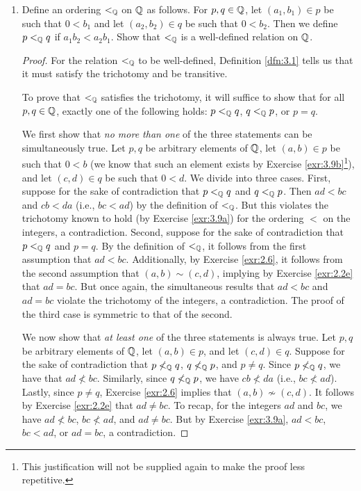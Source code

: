 \documentclass[../main.tex]{subfiles}
\begin{document}
\begin{exercise}
\begin{enumerate}[label={\alph*)},ref={\thetheorem\alph*}]
\begin{proof}
        \end{proof}
        \item \label{exr:3.9c}Define an ordering $<_{\mathbb{Q}}$ on $\mathbb{Q}$ as follows. For $p,q\in\mathbb{Q}$, let $(a_1,b_1)\in p$ be such that $0<b_1$ and let $(a_2,b_2)\in q$ be such that $0<b_2$. Then we define $p<_{\mathbb{Q}} q$ if $a_1b_2<a_2b_1$. Show that $<_{\mathbb{Q}}$ is a well-defined relation on $\mathbb{Q}$.
        \begin{proof}
            For the relation $<_{\mathbb{Q}}$ to be well-defined, Definition \ref{dfn:3.1} tells us that it must satisfy the trichotomy and be transitive.\par\smallskip
            To prove that $<_{\mathbb{Q}}$ satisfies the trichotomy, it will suffice to show that for all $p,q\in\mathbb{Q}$, exactly one of the following holds: $p<_{\mathbb{Q}} q$, $q<_{\mathbb{Q}} p$, or $p=q$.\par
            We first show that \emph{no more than one} of the three statements can be simultaneously true. Let $p,q$ be arbitrary elements of $\mathbb{Q}$, let $(a,b)\in p$ be such that $0<b$ (we know that such an element exists by Exercise \ref{exr:3.9b}\footnote{This justification will not be supplied again to make the proof less repetitive.}), and let $(c,d)\in q$ be such that $0<d$. We divide into three cases. First, suppose for the sake of contradiction that $p<_{\mathbb{Q}} q$ and $q<_{\mathbb{Q}} p$. Then $ad<bc$ and $cb<da$ (i.e., $bc<ad$) by the definition of $<_{\mathbb{Q}}$. But this violates the trichotomy known to hold (by Exercise \ref{exr:3.9a}) for the ordering $<$ on the integers, a contradiction. Second, suppose for the sake of contradiction that $p<_{\mathbb{Q}} q$ and $p=q$. By the definition of $<_{\mathbb{Q}}$, it follows from the first assumption that $ad<bc$. Additionally, by Exercise \ref{exr:2.6}, it follows from the second assumption that $(a,b)\sim(c,d)$, implying by Exercise \ref{exr:2.2e} that $ad=bc$. But once again, the simultaneous results that $ad<bc$ and $ad=bc$ violate the trichotomy of the integers, a contradiction. The proof of the third case is symmetric to that of the second.\par
            We now show that \emph{at least one} of the three statements is always true. Let $p,q$ be arbitrary elements of $\mathbb{Q}$, let $(a,b)\in p$, and let $(c,d)\in q$. Suppose for the sake of contradiction that $p\not<_{\mathbb{Q}} q$, $q\not<_{\mathbb{Q}} p$, and $p\neq q$. Since $p\not<_{\mathbb{Q}} q$, we have that $ad\not<bc$. Similarly, since $q\not<_{\mathbb{Q}} p$, we have $cb\not<da$ (i.e., $bc\not<ad$). Lastly, since $p\neq q$, Exercise \ref{exr:2.6} implies that $(a,b)\nsim(c,d)$. It follows by Exercise \ref{exr:2.2e} that $ad\neq bc$. To recap, for the integers $ad$ and $bc$, we have $ad\not<bc$, $bc\not<ad$, and $ad\neq bc$. But by Exercise \ref{exr:3.9a}, $ad<bc$, $bc<ad$, or $ad=bc$, a contradiction.\par\smallskip

\end{proof}
\end{enumerate}
\end{exercise}
\end{document}
